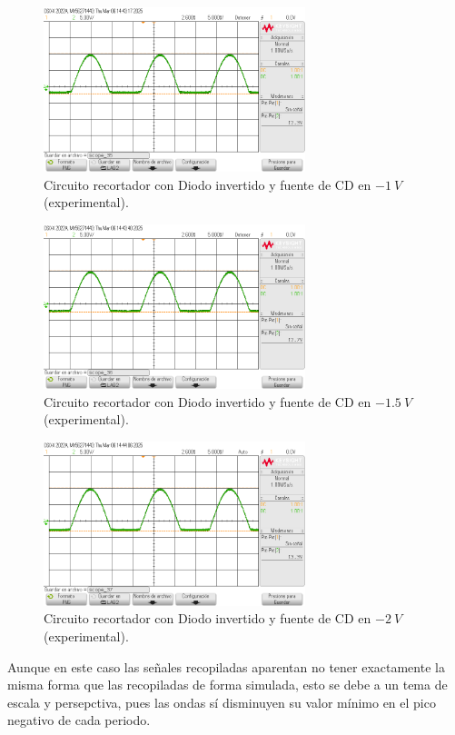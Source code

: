 \documentclass[journal]{IEEEtran}
\begin{document}
\begin{figure}[H]
        \centering
        \includegraphics[width=3in]{SignalExperimental_17.png}
        \caption{Circuito recortador con Diodo invertido y fuente de CD en $-1~V$ (experimental).}
        \label{fig:SignalExperimental_18}
\end{figure}
\begin{figure}[H]
        \centering
        \includegraphics[width=3in]{SignalExperimental_18.png}
        \caption{Circuito recortador con Diodo invertido y fuente de CD en $-1.5~V$ (experimental).}
        \label{fig:SignalExperimental_19}
\end{figure}
\begin{figure}[H]
        \centering
        \includegraphics[width=3in]{SignalExperimental_19.png}
        \caption{Circuito recortador con Diodo invertido y fuente de CD en $-2~V$ (experimental).}
        \label{fig:SignalExperimental_20}
\end{figure}

Aunque en este caso las señales recopiladas aparentan no tener exactamente la misma forma que las recopiladas de forma simulada,
esto se debe a un tema de escala y persepctiva, pues las ondas sí disminuyen su valor mínimo en el pico negativo de cada periodo.
\end{document}
